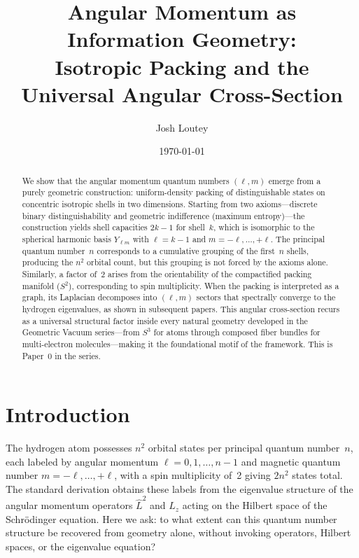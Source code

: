 \documentclass[aps,prl,reprint,amsmath,amssymb]{revtex4-2}
\begin{document}
\title{Angular Momentum as Information Geometry:\\Isotropic Packing and the Universal Angular Cross-Section}

\author{Josh Loutey}

\date{\today}

\begin{abstract}
We show that the angular momentum quantum numbers $(\ell, m)$ emerge
from a purely geometric construction: uniform-density packing of
distinguishable states on concentric isotropic shells in two
dimensions.  Starting from two axioms---discrete binary
distinguishability and geometric indifference (maximum entropy)---the
construction yields shell capacities $2k-1$ for shell~$k$, which is
isomorphic to the spherical harmonic basis $Y_{\ell m}$ with
$\ell = k - 1$ and $m = -\ell, \ldots, +\ell$.  The principal quantum
number~$n$ corresponds to a cumulative grouping of the first~$n$
shells, producing the $n^2$ orbital count, but this grouping is not
forced by the axioms alone.  Similarly, a factor of~2 arises from the
orientability of the compactified packing manifold ($S^2$),
corresponding to spin multiplicity.  When the packing is interpreted
as a graph, its Laplacian decomposes into $(\ell, m)$ sectors that
spectrally converge to the hydrogen eigenvalues, as shown in
subsequent papers.  This angular cross-section recurs as a universal
structural factor inside every natural geometry developed in the
Geometric Vacuum series---from $S^3$ for atoms through composed fiber
bundles for multi-electron molecules---making it the foundational
motif of the framework.  This is Paper~0 in the series.
\end{abstract}

\maketitle

\section{Introduction}
\label{sec:introduction}

The hydrogen atom possesses $n^2$ orbital states per principal quantum
number~$n$, each labeled by angular momentum
$\ell = 0, 1, \ldots, n-1$ and magnetic quantum number
$m = -\ell, \ldots, +\ell$, with a spin multiplicity of~2 giving
$2n^2$ states total.  The standard derivation obtains these labels
from the eigenvalue structure of the angular momentum operators
$\hat{L}^2$ and $\hat{L}_z$ acting on the Hilbert space of the
Schr\"odinger equation.  Here we ask: to what extent can this quantum
number structure be recovered from geometry alone, without invoking
operators, Hilbert spaces, or the eigenvalue equation?
\end{document}

